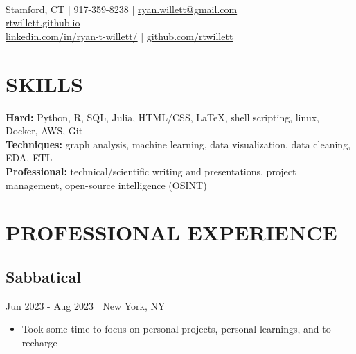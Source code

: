 \documentclass[11pt]{article}
\title{\vspace{-7cm}}
\date{}
\author{Ryan Willett}
\newenvironment{myitemize}
{ \begin{itemize}
	\setlength{\itemsep}{0pt}
	\setlength{\parskip}{0pt}
	\setlength{\parsep}{0pt}     }
{ \end{itemize}                  }
\begin{document}
\maketitle

\section*{}
  \\
\normalsize
Stamford, CT | 917-359-8238 | \href{mailto:ryan.willett@gmail.com}{ryan.willett@gmail.com} \\
\href{http://rtwillett.github.io}{rtwillett.github.io} \\
\href{https://linkedin.com/in/ryan-t-willett/}{linkedin.com/in/ryan-t-willett/} | \href{https://github.com/rtwillett}{github.com/rtwillett}

\raggedright

\section*{SKILLS}
{\bfseries Hard:} Python, R, SQL, Julia, HTML/CSS, \LaTeX, shell scripting, linux, Docker, AWS, Git \\
{\bfseries Techniques:} graph analysis, machine learning, data visualization, data cleaning, EDA, ETL \\
{\bfseries Professional:} technical/scientific writing and presentations, project management, open-source intelligence (OSINT)

\section*{PROFESSIONAL EXPERIENCE}

\subsection*{Sabbatical}
{\bfseries}Jun 2023 - Aug 2023 | New York, NY
\begin{myitemize}
	\item Took some time to focus on personal projects, personal learnings, and to recharge
\end{myitemize}
\end{document}

